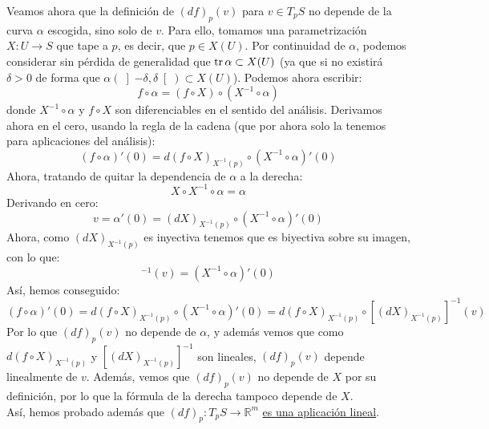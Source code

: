 \noindent
Veamos ahora que la definición de $(d f)_p(v)$ para $v\in T_pS$ no depende de la curva $\alpha$ escogida, sino solo de $v$. Para ello, tomamos una parametrización $X:U\to S$ que tape a $p$, es decir, que $p\in X(U)$. Por continuidad de $\alpha$, podemos considerar sin pérdida de generalidad que $\operatorname{tr} \alpha \subset X(U)$ (ya que si no existirá $\delta>0$ de forma que $\alpha(\left]-\delta,\delta\right[)\subset X(U)$). Podemos ahora escribir:
\begin{equation*}
    f\circ \alpha = (f \circ X) \circ (X^{-1} \circ \alpha)
\end{equation*}
donde $X^{-1}\circ \alpha$ y $f\circ X$ son diferenciables en el sentido del análisis. Derivamos ahora en el cero, usando la regla de la cadena (que por ahora solo la tenemos para aplicaciones del análisis):
\begin{equation*}
    (f\circ \alpha)'(0) = d(f\circ X)_{X^{-1}(p)}\circ (X^{-1}\circ \alpha)'(0)
\end{equation*}
Ahora, tratando de quitar la dependencia de $\alpha$ a la derecha:
\begin{equation*}
    X\circ X^{-1}\circ \alpha = \alpha
\end{equation*}
Derivando en cero:
\begin{equation*}
    v = \alpha'(0) = (dX)_{X^{-1}(p)}\circ (X^{-1}\circ \alpha)'(0)
\end{equation*}
Ahora, como $(dX)_{X^{-1}(p)}$ es inyectiva tenemos que es biyectiva sobre su imagen, con lo que:
\begin{equation*}
    [(dX)_{X^{-1}(p)}]^{-1}(v) = (X^{-1}\circ \alpha)'(0) 
\end{equation*}
Así, hemos conseguido:
\begin{equation*}
    (f\circ \alpha)'(0) = d(f\circ X)_{X^{-1}(p)}\circ (X^{-1}\circ \alpha)'(0) = d(f\circ X)_{X^{-1}(p)}\circ [(dX)_{X^{-1}(p)}]^{-1}(v)
\end{equation*}
Por lo que $(d f)_p(v)$ no depende de $\alpha$, y además vemos que como $d(f\circ X)_{X^{-1}(p)}$ y $[(dX)_{X^{-1}(p)}]^{-1}$ son lineales, $(d f)_p(v)$ depende linealmente de $v$. Además, vemos que $(d f)_p(v)$ no depende de $X$ por su definición, por lo que la fórmula de la derecha tampoco depende de $X$.\\

\noindent
Así, hemos probado además que $(d f)_p:T_pS\to \mathbb{R}^m$ \underline{es una aplicación lineal}.\\

